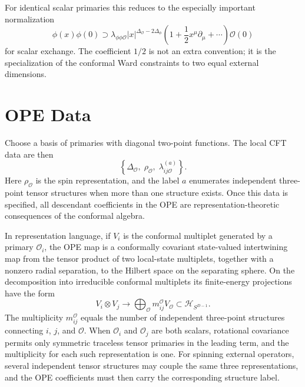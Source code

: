 For identical scalar primaries this reduces to the especially important
normalization
\begin{equation}
  \phi(x)\phi(0)
  \supset
  \lambda_{\phi\phi\mathcal O}
  |x|^{\Delta_{\mathcal O}-2\Delta_\phi}
  \left(1+\frac12 x^\mu\partial_\mu+\cdots\right)\mathcal O(0)
  \label{eq:identical-scalar-scalar-ope-first-descendant}
\end{equation}
for scalar exchange.  The coefficient \(1/2\) is not an extra convention; it
is the specialization of the conformal Ward constraints to two equal external
dimensions.

\section{OPE Data}

Choose a basis of primaries with diagonal two-point functions.  The local CFT
data are then
\begin{equation}
  \left\{
    \Delta_{\mathcal O},\;
    \rho_{\mathcal O},\;
    \lambda_{ij\mathcal O}^{(a)}
  \right\}.
  \label{eq:cft-local-ope-data}
\end{equation}
Here \(\rho_{\mathcal O}\) is the spin representation, and the label \(a\)
enumerates independent three-point tensor structures when more than one
structure exists.  Once this data is specified, all descendant coefficients in
the OPE are representation-theoretic consequences of the conformal algebra.

In representation language, if \(V_i\) is the conformal multiplet generated
by a primary \(\mathcal O_i\), the OPE map is a conformally covariant
state-valued intertwining map from the tensor product of two local-state
multiplets, together with a nonzero radial separation, to the Hilbert space
on the separating sphere.  On the decomposition into irreducible conformal
multiplets its finite-energy projections have the form
\[
  V_i\otimes V_j
  \longrightarrow
  \bigoplus_{\mathcal O} m_{ij}^{\mathcal O}V_{\mathcal O}
  \subset \mathcal H_{S^{D-1}} .
\]
The multiplicity \(m_{ij}^{\mathcal O}\) equals the number of independent
three-point structures connecting \(i\), \(j\), and \(\mathcal O\).  When
\(\mathcal O_i\) and \(\mathcal O_j\) are both scalars, rotational covariance
permits only symmetric traceless tensor primaries in the leading term, and
the multiplicity for each such representation is one.  For spinning external
operators, several independent tensor structures may couple the same three
representations, and the OPE coefficients must then carry the corresponding
structure label.


